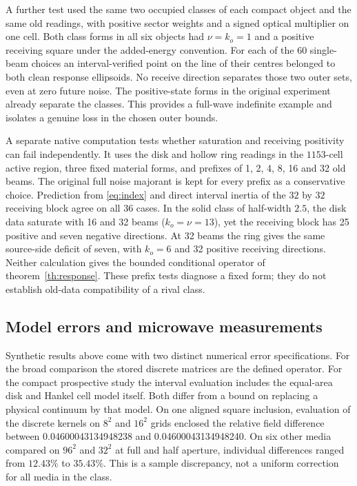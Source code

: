 A further test used the same two occupied classes of each compact object and the same old readings, with positive sector weights and a signed optical multiplier on one cell. Both class forms in all six objects had $\nu=k_o=1$ and a positive receiving square under the added-energy convention. For each of the 60 single-beam choices an interval-verified point on the line of their centres belonged to both clean response ellipsoids. No receive direction separates those two outer sets, even at zero future noise. The positive-state forms in the original experiment already separate the classes. This provides a full-wave indefinite example and isolates a genuine loss in the chosen outer bounds.

A separate native computation tests whether saturation and receiving positivity can fail independently. It uses the disk and hollow ring readings in the $1153$-cell active region, three fixed material forms, and prefixes of 1, 2, 4, 8, 16 and 32 old beams. The original full noise majorant is kept for every prefix as a conservative choice. Prediction from \eqref{eq:index} and direct interval inertia of the $32$ by $32$ receiving block agree on all 36 cases. In the solid class of half-width $2.5$, the disk data saturate with 16 and 32 beams ($k_o=\nu=13$), yet the receiving block has 25 positive and seven negative directions. At 32 beams the ring gives the same source-side deficit of seven, with $k_o=6$ and 32 positive receiving directions. Neither calculation gives the bounded conditional operator of theorem~\ref{th:response}. These prefix tests diagnose a fixed form; they do not establish old-data compatibility of a rival class.


\subsection{Model errors and microwave measurements}
Synthetic results above come with two distinct numerical error specifications. For the broad comparison the stored discrete matrices are the defined operator. For the compact prospective study the interval evaluation includes the equal-area disk and Hankel cell model itself. Both differ from a bound on replacing a physical continuum by that model. On one aligned square inclusion, evaluation of the discrete kernels on $8^2$ and $16^2$ grids enclosed the relative field difference between 0.04600043134948238 and 0.04600043134948240. On six other media compared on $96^2$ and $32^2$ at full and half aperture, individual differences ranged from $12.43\%$ to $35.43\%$. This is a sample discrepancy, not a uniform correction for all media in the class.

